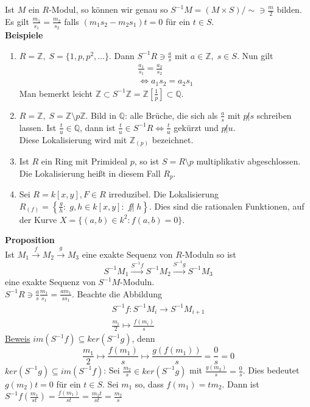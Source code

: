 \documentclass[a4paper, 12pt]{article}
\begin{document}
Ist $M$ ein $R$-Modul, so können wir genau so $S^{-1}M = (M\times S) / \sim \ni \frac{m}{2}$ bilden. Es gilt $\frac{m_1}{s_1} = \frac{m_2}{s_2}$ falls $(m_1s_2 - m_2s_1)t = 0$ für ein $t \in S$.\\
\textbf{Beispiele}
\begin{enumerate}
	\item $R = \mathbb{Z}, \; S = \{1,p,p^2,...\}$. Dann $S^{-1}R \ni \frac{a}{s}$ mit $a \in \mathbb{Z}, \; s \in S$. Nun gilt \begin{align*}
		\frac{a_1}{s_1} = \frac{a_2}{s_2}\\
		\Leftrightarrow a_1s_2 = a_2s_1
	\end{align*}
Man bemerkt leicht $\mathbb{Z} \subset S^{-1}\mathbb{Z} = \mathbb{Z}[\frac{1}{p}] \subset \mathbb{Q}$.
\item $R = \mathbb{Z}, \; S = \mathbb{Z}\setminus p \mathbb{Z}$. Bild in $\mathbb{Q}$: alle Brüche, die sich als $\frac{a}{s}$ mit $p \not | s$ schreiben lassen. Ist $\frac{t}{u} \in \mathbb{Q}$, dann ist $\frac{t}{u} \in S^{-1}R \Leftrightarrow \frac{t}{u}$ gekürzt und $p \not | u$.\\
Diese Lokalisierung wird mit $\mathbb{Z}_{(p)}$ bezeichnet.
\item Ist $R$ ein Ring mit Primideal $p$, so ist $S = R\setminus p$ multiplikativ abgeschlossen. Die Lokalisierung heißt in diesem Fall $R_p$.
\item Sei $R = k[x,y], F \in R$ irreduzibel. Die Lokalisierung $R_{(f)} = \left\{\frac{g}{h}: \; g,h \in k[x,y]: \; f \not |\; h\right\}$. Dies sind die rationalen Funktionen, auf der Kurve $X = \{(a,b) \in k^2: f(a,b) = 0\}$. 
\end{enumerate} 
\textbf{Proposition}\\
Ist $M_1 \overset{f}{\to} M_2 \overset{g}{\to} M_3$ eine exakte Sequenz von $R$-Moduln so ist \[S^{-1}M_1 \overset{S^{-1}f}{\to} S^{-1}M_2 \overset{S^{-1}g}{\to} S^{-1}M_3\] eine exakte Sequenz von $S^{-1}M$-Moduln.\\
$S^{-1}R \ni \frac{a}{s} \frac{m_1}{s_1} = \frac{am_1}{ss_1}$. Beachte die Abbildung \begin{align*}
	S^{-1}f: S^{-1}M_i \to S^{-1}M_{i+1}\\
	\frac{m_i}{2} \mapsto \frac{f(m_i)}{s}
\end{align*}
\underline{Beweis} $im(S^{-1}f) \subseteq ker(S^{-1}g)$, denn \[\frac{m_1}{2} \mapsto \frac{f(m_1)}{s} \mapsto \frac{g(f(m_1))}{s} = \frac{0}{s} = 0\]
$ker(S^{-1}g) \subseteq im(S^{-1}f)$: Sei $\frac{m_2}{s} \in ker(S^{-1}g)$ mit $\frac{g(m_2)}{s} = \frac{0}{s}$. Dies bedeutet $g(m_2)t = 0$ für ein $t \in S$. Sei $m_1$ so, dass $f(m_1) = tm_2$. Dann ist $S^{-1}f\left(\frac{m_1}{st}\right) = \frac{f(m_1)}{st} = \frac{m_2t}{st} = \frac{m_2}{s}$\\
\end{document}
